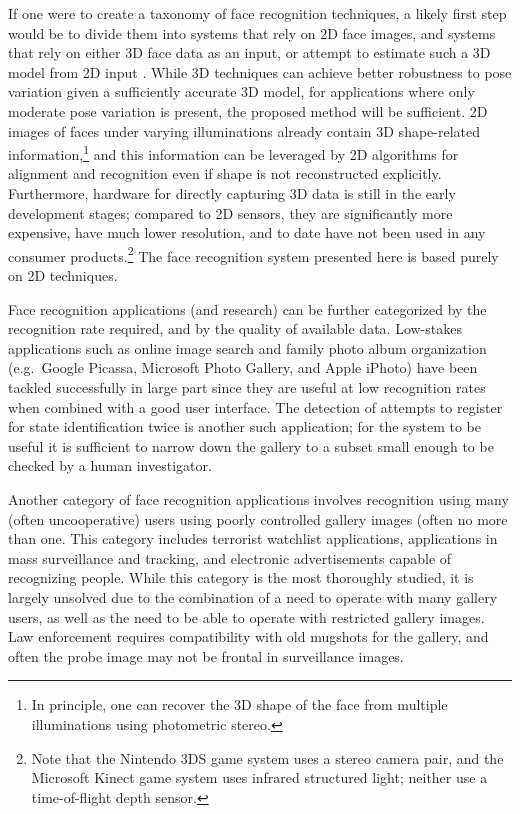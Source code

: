 If one were to create a taxonomy of face recognition techniques, a likely first
step would be to divide them into systems that rely on 2D face images, and
systems that rely on either 3D face data as an input, or attempt to estimate
such a 3D model from 2D input \cite{amberg2007reconstructing,Blanz2003-PAMI}.
While 3D techniques can achieve better robustness to pose variation given a
sufficiently accurate 3D model, for applications where only moderate pose
variation is present, the proposed method will be sufficient.  2D images of
faces under varying illuminations already contain 3D shape-related
information,\footnote{In principle, one can recover the 3D shape of the face
from multiple illuminations using photometric stereo.} and this information can
be leveraged by 2D algorithms for alignment and recognition even if shape is
not reconstructed explicitly.  Furthermore, hardware for directly capturing 3D
data is still in the early development stages; compared to 2D sensors, they are
significantly more expensive, have much lower resolution, and to date have not
been used in any consumer products.\footnote{Note that the Nintendo 3DS game
system uses a stereo camera pair, and the Microsoft Kinect game system uses
infrared structured light; neither use a time-of-flight depth sensor.}  The
face recognition system presented here is based purely on 2D techniques.

Face recognition applications (and research) can be further categorized by the
recognition rate required, and by the quality of available data.  Low-stakes
applications such as online image search and family photo album organization
(e.g.\ Google Picassa, Microsoft Photo Gallery, and Apple iPhoto) have been
tackled successfully in large part since they are useful at low recognition
rates when combined with a good user interface.  The detection of attempts to
register for state identification twice is another such application; for the
system to be useful it is sufficient to narrow down the gallery to a subset
small enough to be checked by a human investigator.

Another category of face recognition applications involves recognition using
many (often uncooperative) users using poorly controlled gallery images (often
no more than one.  This category includes terrorist watchlist applications,
applications in mass surveillance and tracking, and electronic advertisements
capable of recognizing people.  While this category is the most thoroughly
studied, it is largely unsolved due to the combination of a need to operate
with many gallery users, as well as the need to be able to operate with
restricted gallery images.  Law enforcement requires compatibility with old
mugshots for the gallery, and often the probe image may not be frontal in
surveillance images.

